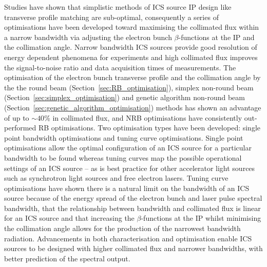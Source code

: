 \documentclass[../main.tex]{subfiles}
\begin{document}
Studies have shown that simplistic methods of ICS source IP design like transverse profile matching are sub-optimal, consequently a series of optimisations have been developed toward maximising the collimated flux within a narrow bandwidth via adjusting the electron bunch $\beta$-functions at the IP and the collimation angle. Narrow bandwidth ICS sources provide good resolution of energy dependent phenomena for experiments and high collimated flux improves the signal-to-noise ratio and data acquisition times of measurements. The optimisation of the electron bunch transverse profile and the collimation angle by the the round beam (Section~\ref{sec:RB_optimisation}), simplex non-round beam (Section~\ref{sec:simplex_optimisation}) and genetic algorithm non-round beam (Section~\ref{sec:genetic_algorithm_optimisation}) methods has shown an advantage of up to $\sim 40$\% in collimated flux, and NRB optimisations have consistently out-performed RB optimisations. Two optimisation types have been developed: single point bandwidth optimisations and tuning curve optimisations. Single point optimisations allow the optimal configuration of an ICS source for a particular bandwidth to be found whereas tuning curves map the possible operational settings of an ICS source -- as is best practice for other accelerator light sources such as synchrotron light sources and free electron lasers. Tuning curve optimisations have shown there is a natural limit on the bandwidth of an ICS source because of the energy spread of the electron bunch and laser pulse spectral bandwidth, that the relationship between bandwidth and collimated flux is linear for an ICS source and that increasing the $\beta$-functions at the IP whilst minimising the collimation angle allows for the production of the narrowest bandwidth radiation. Advancements in both characterisation and optimisation enable ICS sources to be designed with higher collimated flux and narrower bandwidths, with better prediction of the spectral output. 
\end{document}
